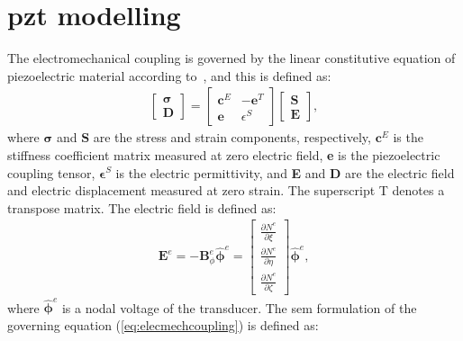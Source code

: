 \section{\Acs{pzt} modelling}
\label{sec:PZTmodel}

The electromechanical coupling is governed by the linear constitutive equation of piezoelectric material according to~\cite{giurgiutiu2009micromechatronics, rekatsinas2017cubic}, and this is defined as:
\begin{eqnarray}
	\left [ 
	\begin {array}{c}
	\boldsymbol{\sigma}\\
	\textbf{D}
\end{array}\right ]=
\left [ 
\begin{array}{cc}
	\textbf{c}^E & -\textbf{e}^T \\
	\textbf{e} & \epsilon^S 
\end{array} \right ]
\left[ 
\begin{array}{c}
	\textbf{S}\\
	\textbf{E} 
\end{array} \right ],
\label{eq:elecmechcoupling}
\end{eqnarray}
where \(\boldsymbol{\sigma}\) and \(\textbf{S}\) are the stress and strain components, respectively, \(\textbf{c}^E\) is the stiffness coefficient matrix measured at zero electric field, \textbf{e} is the piezoelectric coupling tensor,  \(\boldsymbol{\epsilon}^S\) is the electric permittivity, and \textbf{E} and \textbf{D} are the electric field and electric displacement measured at zero strain.
The superscript T denotes a transpose matrix.
The electric field is defined as:
\begin{eqnarray}
\textbf{E}^e=-\textbf{B}_\phi^e \widehat{\boldsymbol{\phi}}^e = \left[ \begin{array}{c}
	\frac{\partial N^e}{\partial \xi}\\
	\frac{\partial N^e}{\partial \eta}\\
	\frac{\partial N^e}{\partial \zeta}
\end{array} \right] \widehat{\boldsymbol{\phi}}^e,
\end{eqnarray}
where \(\widehat{\boldsymbol{\phi}}^e\) is a nodal voltage of the transducer. The \ac{sem} formulation of the governing equation (\ref{eq:elecmechcoupling}) is defined as:
